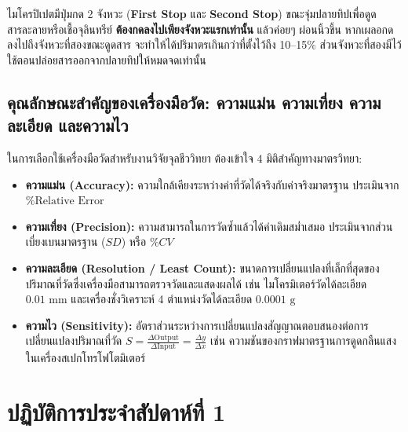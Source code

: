 \begin{warningbox}
ไมโครปิเปตมีปุ่มกด 2 จังหวะ (\textbf{First Stop} และ \textbf{Second Stop}) ขณะจุ่มปลายทิปเพื่อดูดสารละลายหรือเชื้อจุลินทรีย์ \textbf{ต้องกดลงไปเพียงจังหวะแรกเท่านั้น} แล้วค่อยๆ ผ่อนนิ้วขึ้น หากเผลอกดลงไปถึงจังหวะที่สองขณะดูดสาร จะทำให้ได้ปริมาตรเกินกว่าที่ตั้งไว้ถึง 10--15\% ส่วนจังหวะที่สองมีไว้ใช้ตอนปล่อยสารออกจากปลายทิปให้หมดจดเท่านั้น
\end{warningbox}

\subsection{คุณลักษณะสำคัญของเครื่องมือวัด: ความแม่น ความเที่ยง ความละเอียด และความไว}

ในการเลือกใช้เครื่องมือวัดสำหรับงานวิจัยจุลชีววิทยา ต้องเข้าใจ 4 มิติสำคัญทางมาตรวิทยา:
\begin{itemize}
    \item \textbf{ความแม่น (Accuracy):} ความใกล้เคียงระหว่างค่าที่วัดได้จริงกับค่าจริงมาตรฐาน ประเมินจาก $\% \text{Relative Error}$
    \item \textbf{ความเที่ยง (Precision):} ความสามารถในการวัดซ้ำแล้วได้ค่าเดิมสม่ำเสมอ ประเมินจากส่วนเบี่ยงเบนมาตรฐาน ($SD$) หรือ $\%CV$
    \item \textbf{ความละเอียด (Resolution / Least Count):} ขนาดการเปลี่ยนแปลงที่เล็กที่สุดของปริมาณที่วัดซึ่งเครื่องมือสามารถตรวจวัดและแสดงผลได้ เช่น ไมโครมิเตอร์วัดได้ละเอียด $0.01\text{ mm}$ และเครื่องชั่งวิเคราะห์ 4 ตำแหน่งวัดได้ละเอียด $0.0001\text{ g}$
    \item \textbf{ความไว (Sensitivity):} อัตราส่วนระหว่างการเปลี่ยนแปลงสัญญาณตอบสนองต่อการเปลี่ยนแปลงปริมาณที่วัด $S = \frac{\Delta \text{Output}}{\Delta \text{Input}} = \frac{\Delta y}{\Delta x}$ เช่น ความชันของกราฟมาตรฐานการดูดกลืนแสงในเครื่องสเปกโทรโฟโตมิเตอร์
\end{itemize}

\section{ปฏิบัติการประจำสัปดาห์ที่ 1}


